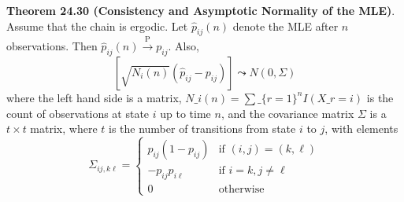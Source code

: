 \textbf{Theorem 24.30 (Consistency and Asymptotic Normality of the
MLE)}. Assume that the chain is ergodic. Let \(\hat{p}_{ij}(n)\) denote
the MLE after \(n\) observations. Then
\(\hat{p}_{ij}(n) \xrightarrow{\textrm{P}} p_{ij}\). Also,
\[
\left[ \sqrt{N_{i}(n)} (\hat{p}_{ij} - p_{ij})  \right] \leadsto N(0, \Sigma)
\]
where the left hand side is a matrix, $ N\_{i}(n) = \sum\_\{r=1\}^{n}
I(X\_r = i)$ is the count of observations at state \(i\) up to time
\(n\), and the covariance matrix \(\Sigma\) is a \(t \times t\) matrix,
where \(t\) is the number of transitions from state \(i\) to \(j\), with
elements
\[
\Sigma_{ij, k\ell} = \begin{cases}
p_{ij}(1 - p_{ij}) &\text{if } (i, j) = (k, \ell) \\
-p_{ij} p_{i\ell} &\text{if } i = k, j \neq \ell \\
0 &\text{otherwise}
\end{cases}
\]

